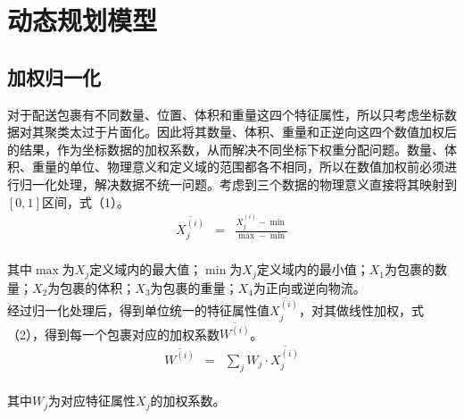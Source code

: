 \documentclass[10.5pt,twocolumn]{jbuaa}
\begin{document}
	\section{动态规划模型}

	\subsection{加权归一化}

	对于配送包裹有不同数量、位置、体积和重量这四个特征属性，所以只考虑坐标数据对其聚类太过于片面化。因此将其数量、体积、重量和正逆向这四个数值加权后的结果，作为坐标数据的加权系数，从而解决不同坐标下权重分配问题。数量、体积、重量的单位、物理意义和定义域的范围都各不相同，所以在数值加权前必须进行归一化处理，解决数据不统一问题。考虑到三个数据的物理意义直接将其映射到$[0,1]$区间，式（1）。
	\begin{eqnarray}
		\overline {X^{\left( i\right) }_{j}}&=&\frac {X^{\left( i\right) }_{j}-\min }{\max -\min }
	\end{eqnarray}
	\\\indent{}其中$\max$为$X_{j}$定义域内的最大值；$\min$为$X_{j}$定义域内的最小值；$X_{1}$为包裹的数量；$X_{2}$为包裹的体积；$X_{3}$为包裹的重量；$X_{4}$为正向或逆向物流。
	\\\indent{}经过归一化处理后，得到单位统一的特征属性值$\overline {X^{\left( i\right) }_{j}}$，对其做线性加权，式（2），得到每一个包裹对应的加权系数$\overline {W^{\left( i\right) }}$。
	\begin{eqnarray}
		\overline {W^{\left( i\right) }}&=&\sum _{j}W_{j}\cdot \overline {X^{\left( i\right) }_{j}}
	\end{eqnarray}
	\\\indent{}其中$W_{j}$为对应特征属性$X_{j}$的加权系数。
\end{document}
